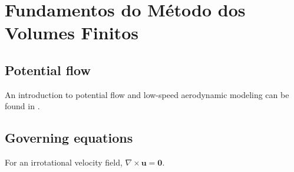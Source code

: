 \chapter{Fundamentos do Método dos Volumes Finitos}
\ChapterTOC

\section{Potential flow}
An introduction to potential flow and low-speed aerodynamic modeling can be found in \cite{katz2001}.

\section{Governing equations}
For an irrotational velocity field, $\nabla\times\mathbf{u}=\mathbf{0}$.

\ChapterReferences
